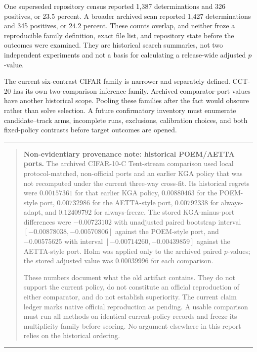 One superseded repository census reported 1,387 determinations and 326 positives, or 23.5 percent.
A broader archived scan reported 1,427 determinations and 345 positives, or 24.2 percent.  These
counts overlap, and neither froze a reproducible family definition, exact file list, and repository
state before the outcomes were examined.  They are historical search summaries, not two
independent experiments and not a basis for calculating a release-wide adjusted $p$-value.

The current six-contrast CIFAR family is narrower and separately defined.  CCT-20 has its own
two-comparison inference family.  Archived comparator-port values have another historical scope.
Pooling these families after the fact would obscure rather than solve selection.  A future
confirmatory inventory must enumerate candidate--track arms, incomplete runs, exclusions,
calibration choices, and both fixed-policy contrasts before target outcomes are opened.

\par\medskip
\noindent\rule{\textwidth}{0.4pt}
\begin{quote}
\small
\textbf{Non-evidentiary provenance note: historical POEM/AETTA ports.}
The archived CIFAR-10-C Tent-stream comparison used local protocol-matched, non-official ports and
an earlier KGA policy that was not recomputed under the current three-way cross-fit.  Its historical
regrets were $0.00157361$ for that earlier KGA policy, $0.00880463$ for the POEM-style port,
$0.00732986$ for the AETTA-style port, $0.00792338$ for always-adapt, and $0.12409792$ for
always-freeze.  The stored KGA-minus-port differences were $-0.00723102$ with unadjusted paired
bootstrap interval $[-0.00878038,-0.00570806]$ against the POEM-style port, and $-0.00575625$ with
interval $[-0.00714260,-0.00439859]$ against the AETTA-style port.  Holm was applied only to the
archived paired $p$-values; the stored adjusted value was $0.00039996$ for each comparison.

These numbers document what the old artifact contains.  They do not support the current policy,
do not constitute an official reproduction of either comparator, and do not establish superiority.
The current claim ledger marks native official reproduction as pending.  A usable comparison must
run all methods on identical current-policy records and freeze its multiplicity family before
scoring.  No argument elsewhere in this report relies on the historical ordering.
\end{quote}
\noindent\rule{\textwidth}{0.4pt}
\par\medskip

